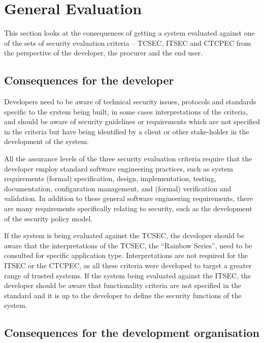 \chapter{General Evaluation}

This section looks at the consequences of getting a system evaluated
against one of the sets of security evaluation criteria -- TCSEC, ITSEC
and CTCPEC from the perspective of the developer, the procurer and the
end user.

\section{Consequences for the developer}

    Developers need to be aware of technical security issues, protocols
    and standards specific to the system being built, in some cases
    interpretations of the criteria, and should be aware of security
    guidelines or requirements which are not specified in the criteria
    but have being identified by a client or other stake-holder in the
    development of the system.

    All the assurance levels of the three security evaluation criteria
    require that the developer employ standard software engineering
    practices, such as system requirements (formal) specification, design, 
    implementation, testing, documentation, configuration management, 
    and (formal) verification and validation. In addition to these general software 
    engineering requirements, there are many requirements specifically 
    relating to security, such as the development of the security policy model.

    If the system is being evaluated against the TCSEC, the developer
    should be aware that the interpretations of the TCSEC, the ``Rainbow
    Series'', need to be consulted for specific application type.
    Interpretations are not required for the ITSEC or the CTCPEC,
    as all these criteria were developed to target a greater range of
    trusted systems. If the system being evaluated against the ITSEC,
    the developer should be aware that functionality criteria are not
    specified in the standard and it is up to the developer to define
    the security functions of the system.

\section{Consequences for the development organisation}

